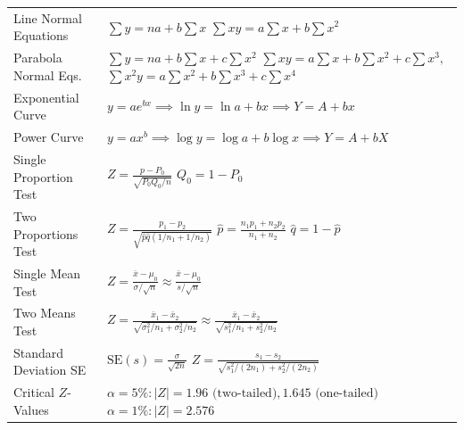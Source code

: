 \documentclass[12pt,a4paper]{article}
\renewcommand{\arraystretch}{1.45}
\begin{document}
\begin{tcolorbox}[formulabox, title={\textbf{Key Normal Equations and Large Sample $Z$-Test Formulas at a Glance}}]
\renewcommand{\arraystretch}{1.35}
\setlength{\tabcolsep}{5pt}
\noindent\begin{tabularx}{\linewidth}{B{3.5cm} Y}
Line Normal Equations & $\sum y = n a + b \sum x$ \newline $\sum x y = a \sum x + b \sum x^2$ \\[3pt]
Parabola Normal Eqs. & $\sum y = n a + b\sum x + c\sum x^2$ \newline $\sum xy = a\sum x + b\sum x^2 + c\sum x^3,$ \newline $\sum x^2 y = a\sum x^2 + b\sum x^3 + c\sum x^4$ \\[3pt]
Exponential Curve & $y = a e^{bx} \implies \ln y = \ln a + bx \implies Y = A + bx$ \\[3pt]
Power Curve & $y = a x^b \implies \log y = \log a + b \log x \implies Y = A + bX$ \\[3pt]
Single Proportion Test & $Z = \frac{p - P_0}{\sqrt{P_0 Q_0 / n}}$ \newline $Q_0 = 1 - P_0$ \\[3pt]
Two Proportions Test & $Z = \frac{p_1 - p_2}{\sqrt{\hat{p}\hat{q}(1/n_1 + 1/n_2)}}$ \newline $\hat{p} = \frac{n_1 p_1 + n_2 p_2}{n_1 + n_2}$ \quad $\hat{q} = 1 - \hat{p}$ \\[3pt]
Single Mean Test & $Z = \frac{\bar{x} - \mu_0}{\sigma / \sqrt{n}} \approx \frac{\bar{x} - \mu_0}{s / \sqrt{n}}$ \\[3pt]
Two Means Test & $Z = \frac{\bar{x}_1 - \bar{x}_2}{\sqrt{\sigma_1^2/n_1 + \sigma_2^2/n_2}} \approx \frac{\bar{x}_1 - \bar{x}_2}{\sqrt{s_1^2/n_1 + s_2^2/n_2}}$ \\[3pt]
Standard Deviation SE & $\text{SE}(s) = \frac{\sigma}{\sqrt{2n}}$ \newline $Z = \frac{s_1 - s_2}{\sqrt{s_1^2/(2n_1) + s_2^2/(2n_2)}}$ \\[3pt]
Critical $Z$-Values & $\alpha = 5\%: |Z| = 1.96 \text{ (two-tailed)}, 1.645 \text{ (one-tailed)}$ \newline $\alpha = 1\%: |Z| = 2.576$ \\[3pt]
\end{tabularx}\par
\end{tcolorbox}

\vspace{1pt}
\end{document}
